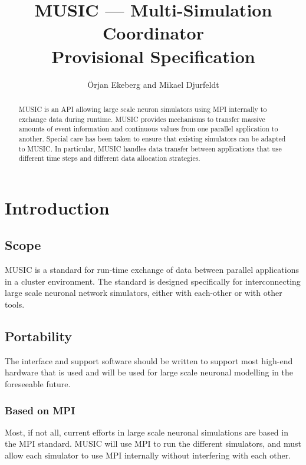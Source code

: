 \documentclass[a4paper]{report}
\begin{document}
\title{MUSIC --- Multi-Simulation Coordinator\\
  Provisional Specification}

\author{Örjan Ekeberg and Mikael Djurfeldt}

\maketitle

\begin{abstract}
  MUSIC is an API allowing large scale neuron simulators using MPI
  internally to exchange data during runtime.  MUSIC provides
  mechanisms to transfer massive amounts of event information and
  continuous values from one parallel application to another.  Special
  care has been taken to ensure that existing simulators can be
  adapted to MUSIC.  In particular, MUSIC handles data transfer
  between applications that use different time steps and different
  data allocation strategies.
\end{abstract}


\tableofcontents

\chapter{Introduction}

\section{Scope}

MUSIC is a standard for run-time exchange of data between parallel
applications in a cluster environment.  The standard is designed
specifically for interconnecting large scale neuronal network
simulators, either with each-other or with other tools.

\section{Portability}

The interface and support software should be written to support most
high-end hardware that is used and will be used for large scale
neuronal modelling in the foreseeable future.


\subsection{Based on MPI}

Most, if not all, current efforts in large scale neuronal simulations
are based in the MPI standard.  MUSIC will use MPI to run the
different simulators, and must allow each simulator to use MPI
internally without interfering with each other.
\end{document}
